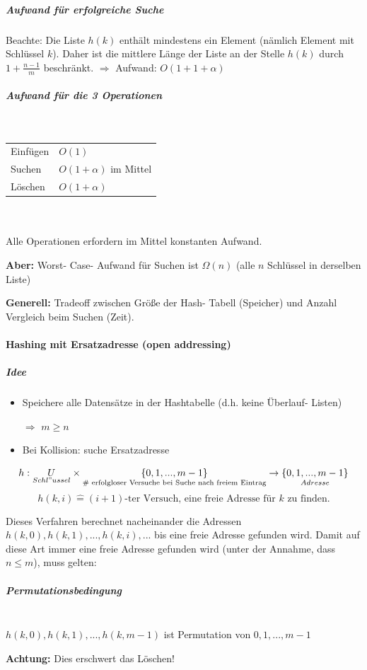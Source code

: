 \documentclass[fleqn]{scrartcl}
\begin{document}
\subparagraph{Aufwand für erfolgreiche Suche} Beachte: Die Liste $h(k)$ enthält mindestens ein Element (nämlich Element mit Schlüssel $k$). Daher ist die mittlere Länge der Liste an der Stelle $h(k)$ durch $1 + \frac{n-1}{m}$ beschränkt. $\Rightarrow$ Aufwand: $O (1 + 1 + \alpha)$

\subparagraph{Aufwand für die 3 Operationen}$ $\\
\begin{tabular} {l l}
Einfügen & $O(1)$\\
Suchen & $O(1 + \alpha)$ im Mittel\\
Löschen & $O(1 + \alpha)$
\end{tabular}\\\\
Alle Operationen erfordern im Mittel konstanten Aufwand.

\textbf{Aber:} Worst- Case- Aufwand für Suchen ist $\Omega(n)$ (alle $n$ Schlüssel in derselben Liste)

\textbf{Generell:} Tradeoff zwischen Größe der Hash- Tabell (Speicher) und Anzahl Vergleich beim Suchen (Zeit).

\paragraph{Hashing mit Ersatzadresse (\glqq open addressing\grqq)}
\subparagraph{Idee}
\begin{itemize}
\item Speichere alle Datensätze in der Hashtabelle (d.h. keine Überlauf- Listen)
\item[$\Rightarrow$] $m \geq n$
\item Bei Kollision: suche Ersatzadresse
\end{itemize}
\[h: \underset{Schl"ussel}{U} \times \underset{\# \text{ erfolgloser Versuche bei Suche nach freiem Eintrag}}{\{0, 1, ..., m-1\}} \rightarrow \underset{Adresse}{\{0, 1, ..., m-1\}}\]
\[h(k,i) \widehat{=} (i+1) \text{-ter Versuch, eine freie Adresse für $k$ zu finden.}\]

Dieses Verfahren berechnet nacheinander die Adressen $h(k, 0), h(k,1), ..., h(k,i), ...$ bis eine freie Adresse gefunden wird. Damit auf diese Art immer eine freie Adresse gefunden wird (unter der Annahme, dass $n\leq m$), muss gelten:
\subparagraph{Permutationsbedingung}$ $\\
$h(k, 0), h(k,1), ..., h(k,m-1)$ ist Permutation von $0, 1, ..., m-1$

\textbf{Achtung:} Dies erschwert das Löschen!
\end{document}
